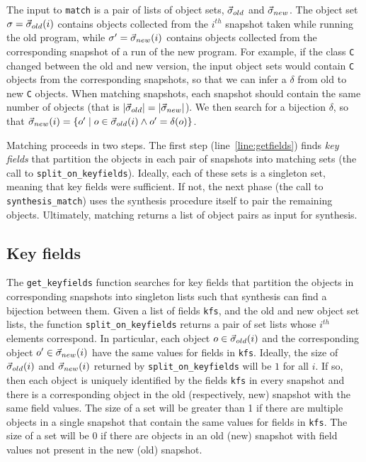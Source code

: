 \documentclass[natbib]{sigplanconf}
\newcommand{\code}[1]{\lstinline|#1|\xspace}
\begin{document}
The input to \code{match} is a pair of lists of object sets,
$\vec{\sigma}_{old}$ and $\vec{\sigma}_{new}$.  The object set $\sigma =
\vec{\sigma}_{old}(i)$ contains objects collected from the $i^{th}$
snapshot taken while running the old program, while $\sigma' =
\vec{\sigma}_{new}(i)$ contains objects collected from the corresponding
snapshot of a run of the new program.  For example, if the class
\code{C} changed between the old and new version, the input object
sets would contain \code{C} objects from the corresponding snapshots,
so that we can infer a $\delta$ from old to new \code{C} objects.
When matching snapshots, each snapshot should contain the same number
of objects (that is $\lvert \vec{\sigma}_{old} \rvert = \lvert \vec{\sigma}_{new} \rvert$).
We then search for a bijection $\delta$, so that $\vec{\sigma}_{new}(i) = \{ o' \mid
o \in \vec{\sigma}_{old}(i) \wedge o' = \delta(o) \}$.

Matching proceeds in two steps.  The first step
(line~\ref{line:getfields}) finds \emph{key fields} that partition the
objects in each pair of snapshots into matching sets (the call to
\code{split_on_keyfields}).  Ideally, each of these sets is a
singleton set, meaning that key fields were sufficient.  If not, the
next phase (the call to \code{synthesis_match}) uses the synthesis
procedure itself to pair the remaining objects.  Ultimately, matching
returns a list of object pairs as input for synthesis.

\subsection{Key fields}

The \code{get_keyfields} function searches for key fields
that  partition the objects in corresponding snapshots into singleton lists  
such that synthesis can find a bijection between them. %
Given a list of fields \code{kfs}, and the old and new object set
lists, the function \code{split_on_keyfields} returns a pair of set
lists whose $i^{th}$ elements correspond.  In particular, each object
$o \in \vec{\sigma}_{old}(i)$ and the corresponding object $o' \in
\vec{\sigma}_{new}(i)$ have the same values for fields in \code{kfs}.
Ideally, the size of $\vec{\sigma}_{old}(i)$ and $\vec{\sigma}_{new}(i)$
returned by \code{split_on_keyfields} will be $1$ for all $i$.  If so,
then each object is uniquely identified by the fields \code{kfs} in
every snapshot and there is a corresponding object in the old
(respectively, new) snapshot with the same field values.  The size of
a set will be greater than 1 if there are multiple objects in a single
snapshot that contain the same values for fields in \code{kfs}.  The
size of a set will be 0 if there are objects in an old (new) snapshot
with field values not present in the new (old) snapshot.
\end{document}
